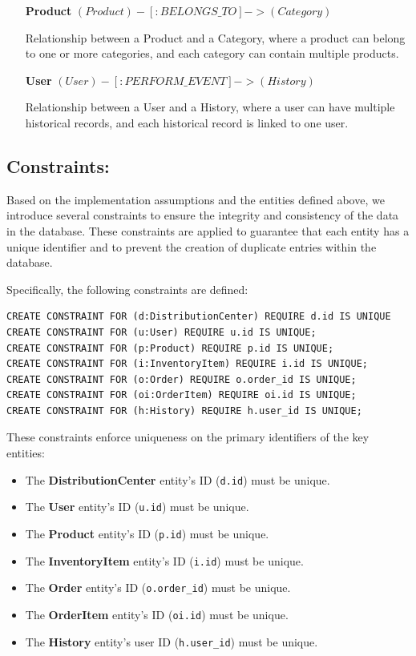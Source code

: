 \documentclass[a4paper,12pt]{article}
\begin{document}
\begin{itemize}[noitemsep]
        \item[\textbf{Product}] $(Product)-[:BELONGS\_TO]->(Category)$
        
        Relationship between a Product and a Category, where a product can belong to one or more categories, and each category can contain multiple products.

        \item[\textbf{User}] $(User)-[:PERFORM\_EVENT]->(History)$

        Relationship between a User and a History, where a user can have multiple historical records, and each historical record is linked to one user.
        
    \end{itemize}
    


\subsection{Constraints:}
\par Based on the implementation assumptions and the entities defined above, we introduce several constraints to ensure the integrity and consistency of the data in the database. These constraints are applied to guarantee that each entity has a unique identifier and to prevent the creation of duplicate entries within the database.

\par Specifically, the following constraints are defined:

\begin{verbatim}
CREATE CONSTRAINT FOR (d:DistributionCenter) REQUIRE d.id IS UNIQUE 
CREATE CONSTRAINT FOR (u:User) REQUIRE u.id IS UNIQUE;
CREATE CONSTRAINT FOR (p:Product) REQUIRE p.id IS UNIQUE;
CREATE CONSTRAINT FOR (i:InventoryItem) REQUIRE i.id IS UNIQUE;
CREATE CONSTRAINT FOR (o:Order) REQUIRE o.order_id IS UNIQUE;
CREATE CONSTRAINT FOR (oi:OrderItem) REQUIRE oi.id IS UNIQUE;
CREATE CONSTRAINT FOR (h:History) REQUIRE h.user_id IS UNIQUE;
\end{verbatim}

\par These constraints enforce uniqueness on the primary identifiers of the key entities:
\begin{itemize}[noitemsep]
    \item The \textbf{DistributionCenter} entity's ID (\texttt{d.id}) must be unique.
    \item The \textbf{User} entity's ID (\texttt{u.id}) must be unique.
    \item The \textbf{Product} entity's ID (\texttt{p.id}) must be unique.
    \item The \textbf{InventoryItem} entity's ID (\texttt{i.id}) must be unique.
    \item The \textbf{Order} entity's ID (\texttt{o.order\_id}) must be unique.
    \item The \textbf{OrderItem} entity's ID (\texttt{oi.id}) must be unique.
    \item The \textbf{History} entity's user ID (\texttt{h.user\_id}) must be unique.
\end{itemize}
\end{document}
